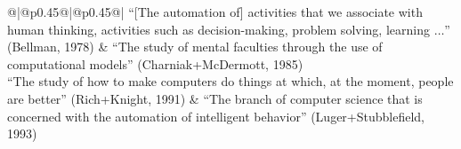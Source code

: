 \begin{LARGE}
\begin{mytabular}{@{\extracolsep{\fill}}|@{}p{0.45\tablewidth}@{}|@{}p{0.45\tablewidth}@{}|}
\hline
 \tabtop ``[The automation of] activities that we associate with human thinking,
activities such as decision-making, problem solving, learning
$\ldots$'' (Bellman, 1978)\tabbot
&
``The study of mental faculties through the use of computational
models'' \newline(Charniak+McDermott, 1985)\tabbot
\\ \hline
\tabtop ``The study of how to make computers do things at which, at the 
moment,  people are better'' (Rich+Knight, 1991)\tabbot
&
``The branch of computer science that is concerned with the automation
of intelligent behavior'' (Luger+Stubblefield, 1993)
\\
\hline
\end{mytabular}%
\end{LARGE}

